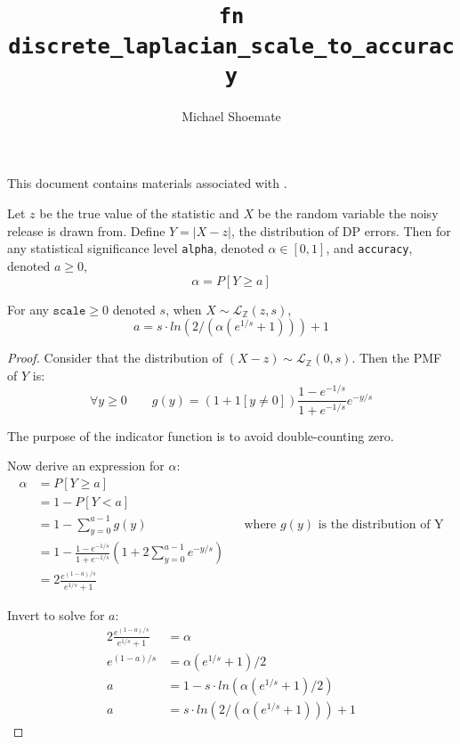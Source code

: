 \documentclass{article}
\title{\texttt{fn discrete\_laplacian\_scale\_to\_accuracy}}
\author{Michael Shoemate}
\begin{document}
\maketitle

This document contains materials associated with .

\begin{definition}
    Let $z$ be the true value of the statistic and $X$ be the random variable the noisy release is drawn from.
    Define $Y = |X - z|$, the distribution of DP errors. 
    Then for any statistical significance level \texttt{alpha}, denoted $\alpha \in [0, 1]$, and \texttt{accuracy}, denoted $a \ge 0$,
    \begin{equation}
        \alpha = P[Y \ge a]
    \end{equation}
\end{definition}

\begin{theorem}
    For any $\texttt{scale} \ge 0$ denoted $s$, when $X \sim \mathcal{L}_\mathbb{Z}(z, s)$, 
    \begin{equation}
        a = s \cdot ln(2 / (\alpha (e^{1/s} + 1))) + 1
    \end{equation}
\end{theorem}

\begin{proof}

Consider that the distribution of $(X - z) \sim \mathcal{L}_\mathbb{Z}(0, s)$.
Then the PMF of $Y$ is:
\begin{equation}
    \forall y \ge 0 \qquad g(y) = (1 + 1[y \ne 0]) \frac{1 - e^{-1/s}}{1 + e^{-1/s}} e^{-y/s}
\end{equation}

The purpose of the indicator function is to avoid double-counting zero.

Now derive an expression for $\alpha$:
\begin{align*}
    \alpha &= P[Y \ge a] \\
    &= 1 - P[Y < a] \\
    &= 1 - \sum_{y=0}^{a - 1} g(y) && \text{where $g(y)$ is the distribution of Y} \\
    &= 1 - \frac{1 - e^{-1/s}}{1 + e^{-1/s}} \left(1 + 2\sum_{y=0}^{a - 1} e^{-y/s}\right) \\
    &= 2 \frac{e^{(1 - a)/s}}{e^{1/s} + 1}
\end{align*}

Invert to solve for $a$:
\begin{align*}
    2 \frac{e^{(1 - a)/s}}{e^{1/s} + 1} &= \alpha \\
    e^{(1 - a)/s} &= \alpha (e^{1/s} + 1) / 2 \\
    a &= 1 - s \cdot ln(\alpha (e^{1/s} + 1) / 2) \\
    a &= s \cdot ln(2 / (\alpha (e^{1/s} + 1))) + 1
\end{align*}

\end{proof}
\end{document}
